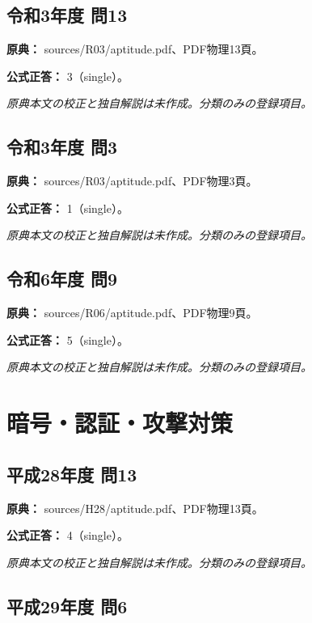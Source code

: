 \subsection{令和3年度 問13}
\label{q:r03-reg-apt-13}

\noindent\textbf{原典：} sources/R03/aptitude.pdf、PDF物理13頁。

\textbf{公式正答：} 3（single）。

\par\textit{原典本文の校正と独自解説は未作成。分類のみの登録項目。}

\subsection{令和3年度 問3}
\label{q:r03-reg-apt-03}

\noindent\textbf{原典：} sources/R03/aptitude.pdf、PDF物理3頁。

\textbf{公式正答：} 1（single）。

\par\textit{原典本文の校正と独自解説は未作成。分類のみの登録項目。}

\subsection{令和6年度 問9}
\label{q:r06-reg-apt-09}

\noindent\textbf{原典：} sources/R06/aptitude.pdf、PDF物理9頁。

\textbf{公式正答：} 5（single）。

\par\textit{原典本文の校正と独自解説は未作成。分類のみの登録項目。}

\section{暗号・認証・攻撃対策}

\subsection{平成28年度 問13}
\label{q:h28-reg-apt-13}

\noindent\textbf{原典：} sources/H28/aptitude.pdf、PDF物理13頁。

\textbf{公式正答：} 4（single）。

\par\textit{原典本文の校正と独自解説は未作成。分類のみの登録項目。}

\subsection{平成29年度 問6}
\label{q:h29-reg-apt-06}

